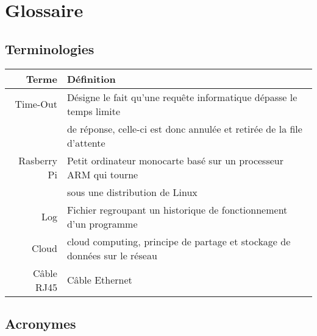 \chapter*{Glossaire}


\section*{Terminologies}

\begin{tabular}{|r|l|}
   	\hline
   	\textbf{Terme} & \textbf{Définition} \\
   	\hline
	Time-Out & Désigne le fait qu'une requête informatique dépasse le temps limite \\
	 & de réponse, celle-ci est donc annulée et retirée de la file d'attente \\
	\hline
   	Rasberry Pi & Petit ordinateur monocarte basé sur un processeur ARM qui tourne \\
   	 & sous une distribution de Linux \\
	\hline
	Log & Fichier regroupant un historique de fonctionnement d'un programme \\
	\hline
	Cloud &  cloud computing, principe de partage et stockage de données sur le réseau\\
   	\hline
   	Câble RJ45 & Câble Ethernet \\
	\hline
\end{tabular}

\section*{Acronymes}

